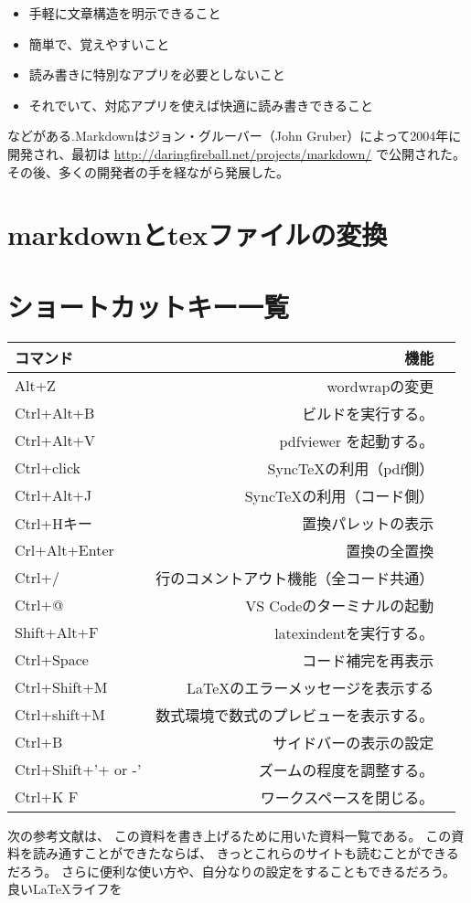 \documentclass{ltjsarticle}
\begin{document}
\begin{itemize}
  \item 手軽に文章構造を明示できること
  \item 簡単で、覚えやすいこと
  \item 読み書きに特別なアプリを必要としないこと
  \item それでいて、対応アプリを使えば快適に読み書きできること
\end{itemize}

などがある.Markdownはジョン・グルーバー（John Gruber）によって2004年に開発され、最初は \url{http://daringfireball.net/projects/markdown/} で公開された。その後、多くの開発者の手を経ながら発展した。
\section{markdownとtexファイルの変換}

\appendix
\section{ショートカットキー一覧}
\begin{center}
  \begin{tabular}{lrr} \hline
    コマンド            & 機能                  \\ \hline
    Alt+Z               & wordwrapの変更        \\
    Ctrl+Alt+B          & ビルドを実行する。       \\
    Ctrl+Alt+V          & pdfviewer を起動する。    \\
    Ctrl+click          & SyncTeXの利用（pdf側）    \\
    Ctrl+Alt+J          & SyncTeXの利用（コード側）    \\
    Ctrl+Hキー          & 置換パレットの表示           \\
    Crl+Alt+Enter       & 置換の全置換              \\
    Ctrl+/              & 行のコメントアウト機能（全コード共通） \\
    Ctrl+@              & VS Codeのターミナルの起動     \\
    Shift+Alt+F         & latexindentを実行する。\\
    Ctrl+Space          & コード補完を再表示\\
    Ctrl+Shift+M        & \LaTeX のエラーメッセージを表示する\\
    Ctrl+shift+M        & 数式環境で数式のプレビューを表示する。\\ 
    Ctrl+B              & サイドバーの表示の設定\\
    Ctrl+Shift+'+ or -' & ズームの程度を調整する。        \\
    Ctrl+K F            & ワークスペースを閉じる。\\ \hline
  \end{tabular}
\end{center}


次の参考文献は、
この資料を書き上げるために用いた資料一覧である。
この資料を読み通すことができたならば、
きっとこれらのサイトも読むことができるだろう。
さらに便利な使い方や、自分なりの設定をすることもできるだろう。
良い\LaTeX ライフを
\nocite{*}


\end{document}
